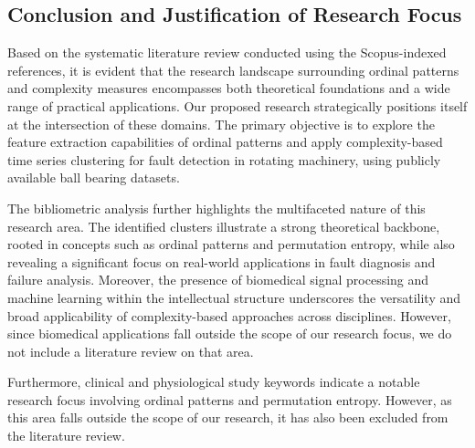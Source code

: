 \subsection{Conclusion and Justification of Research Focus}

Based on the systematic literature review conducted using the Scopus-indexed references, it is evident that the research landscape surrounding ordinal patterns and complexity measures encompasses both theoretical foundations and a wide range of practical applications. Our proposed research strategically positions itself at the intersection of these domains. The primary objective is to explore the feature extraction capabilities of ordinal patterns and apply complexity-based time series clustering for fault detection in rotating machinery, using publicly available ball bearing datasets.

The bibliometric analysis further highlights the multifaceted nature of this research area. The identified clusters illustrate a strong theoretical backbone, rooted in concepts such as ordinal patterns and permutation entropy, while also revealing a significant focus on real-world applications in fault diagnosis and failure analysis. Moreover, the presence of biomedical signal processing and machine learning within the intellectual structure underscores the versatility and broad applicability of complexity-based approaches across disciplines. However, since biomedical applications fall outside the scope of our research focus, we do not include a literature review on that area.

Furthermore, clinical and physiological study keywords indicate a notable research focus involving ordinal patterns and permutation entropy. However, as this area falls outside the scope of our research, it has also been excluded from the literature review.




